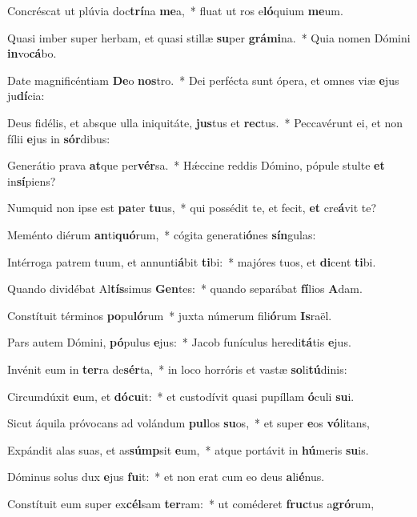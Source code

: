 \item Concréscat ut plúvia doc\textbf{trí}na \textbf{me}a,~* fluat ut ros e\textbf{ló}quium \textbf{me}um.
\item Quasi imber super herbam, et quasi stillæ \textbf{su}per \textbf{grá}\textbf{mi}na.~* Quia nomen Dómini \textbf{in}vo\textbf{cá}bo.
\item Date magnificéntiam \textbf{De}o \textbf{nos}tro.~* Dei perfécta sunt ópera, et omnes viæ \textbf{e}jus ju\textbf{dí}cia:
\item Deus fidélis, et absque ulla iniquitáte, \textbf{jus}tus et \textbf{rec}tus.~* Peccavérunt ei, et non fílii \textbf{e}jus in \textbf{sór}dibus:
\item Generátio prava \textbf{at}que per\textbf{vér}sa.~* Hǽccine reddis Dómino, pópule stulte \textbf{et} in\textbf{sí}piens?
\item Numquid non ipse est \textbf{pa}ter \textbf{tu}us,~* qui possédit te, et fecit, \textbf{et} cre\textbf{á}vit te?
\item Meménto diérum \textbf{an}ti\textbf{quó}rum,~* cógita generati\textbf{ó}nes \textbf{sín}gulas:
\item Intérroga patrem tuum, et annunti\textbf{á}bit \textbf{ti}bi:~* majóres tuos, et \textbf{di}cent \textbf{ti}bi.
\item Quando dividébat Al\textbf{tís}simus \textbf{Gen}tes:~* quando separábat \textbf{fí}lios \textbf{A}dam.
\item Constítuit términos \textbf{po}pu\textbf{ló}rum~* juxta númerum fili\textbf{ó}rum \textbf{Is}raël.
\item Pars autem Dómini, \textbf{pó}pulus \textbf{e}jus:~* Jacob funículus heredi\textbf{tá}tis \textbf{e}jus.
\item Invénit eum in \textbf{ter}ra de\textbf{sér}ta,~* in loco horróris et vastæ \textbf{so}li\textbf{tú}dinis:
\item Circumdúxit \textbf{e}um, et \textbf{dó}\textbf{cu}it:~* et custodívit quasi pupíllam \textbf{ó}culi \textbf{su}i.
\item Sicut áquila próvocans ad volándum \textbf{pul}los \textbf{su}os,~* et super \textbf{e}os \textbf{vó}litans,
\item Expándit alas suas, et as\textbf{súmp}sit \textbf{e}um,~* atque portávit in \textbf{hú}meris \textbf{su}is.
\item Dóminus solus dux \textbf{e}jus \textbf{fu}it:~* et non erat cum eo deus \textbf{a}li\textbf{é}nus.
\item Constítuit eum super ex\textbf{cél}sam \textbf{ter}ram:~* ut coméderet \textbf{fruc}tus a\textbf{gró}rum,

